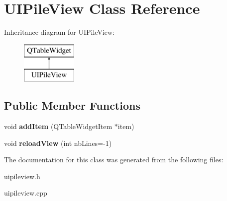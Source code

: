 \hypertarget{class_u_i_pile_view}{}\section{U\+I\+Pile\+View Class Reference}
\label{class_u_i_pile_view}
Inheritance diagram for U\+I\+Pile\+View\+:\begin{figure}[H]
\begin{center}
\leavevmode
\includegraphics[height=2.000000cm]{class_u_i_pile_view}
\end{center}
\end{figure}
\subsection*{Public Member Functions}
\begin{DoxyCompactItemize}
\item 
void {\bfseries add\+Item} (Q\+Table\+Widget\+Item $\ast$item)\hypertarget{class_u_i_pile_view_aaa0811045aa22bcf20433b4ae58edcb9}{}\label{class_u_i_pile_view_aaa0811045aa22bcf20433b4ae58edcb9}

\item 
void {\bfseries reload\+View} (int nb\+Lines=-\/1)\hypertarget{class_u_i_pile_view_ac789cd4cf086281c036d782a19042b15}{}\label{class_u_i_pile_view_ac789cd4cf086281c036d782a19042b15}

\end{DoxyCompactItemize}


The documentation for this class was generated from the following files\+:\begin{DoxyCompactItemize}
\item 
uipileview.\+h\item 
uipileview.\+cpp\end{DoxyCompactItemize}
